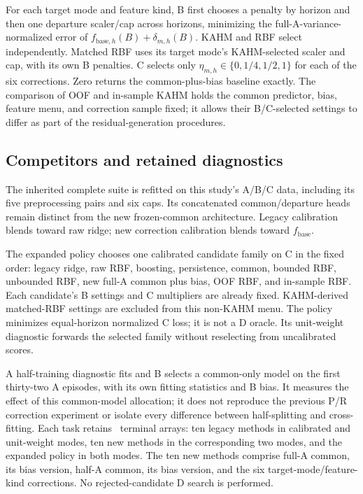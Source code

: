 For each target mode and feature kind, B first chooses a penalty by
horizon and then one departure scaler/cap across horizons, minimizing
the full-A-variance-normalized error of
$f_{\mathrm{base},h}(B)+\delta_{m,h}(B)$. KAHM and RBF select
independently. Matched RBF uses its target mode's KAHM-selected scaler
and cap, with its own B penalties. C selects only
$\eta_{m,h}\in\{0,1/4,1/2,1\}$ for each of the six corrections.
Zero returns the common-plus-bias baseline exactly. The comparison of
OOF and in-sample KAHM holds the common predictor, bias, feature menu,
and correction sample fixed; it allows their B/C-selected settings to
differ as part of the residual-generation procedures.

\subsection{Competitors and retained diagnostics}

The inherited complete suite is refitted on this study's A/B/C data,
including its five preprocessing pairs and six caps. Its concatenated
common/departure heads remain distinct from the new frozen-common
architecture. Legacy calibration blends toward raw ridge; new correction
calibration blends toward $f_{\mathrm{base}}$.

The expanded policy chooses one calibrated candidate family on C in the
fixed order: legacy ridge, raw RBF, boosting, persistence, common,
bounded RBF, unbounded RBF, new full-A common plus bias, OOF RBF,
and in-sample RBF. Each candidate's B settings and C multipliers are
already fixed. KAHM-derived matched-RBF settings are excluded from this
non-KAHM menu. The policy minimizes equal-horizon normalized C loss;
it is not a D oracle. Its unit-weight diagnostic forwards the selected
family without reselecting from uncalibrated scores.

A half-training diagnostic fits and B selects a common-only model on
the first thirty-two A episodes, with its own fitting statistics and
B bias. It measures the effect of this common-model allocation; it does
not reproduce the previous P/R correction experiment or isolate every
difference between half-splitting and cross-fitting. Each task retains
\CFRArraysPerTask\ terminal arrays: ten legacy methods in calibrated and
unit-weight modes, ten new methods in the corresponding two modes, and
the expanded policy in both modes. The ten new methods comprise full-A
common, its bias version, half-A common, its bias version, and the six
target-mode/feature-kind corrections. No rejected-candidate D search is
performed.

